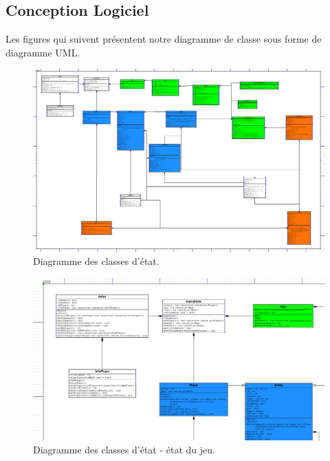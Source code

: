 \subsection{Conception Logiciel}

Les figures qui suivent présentent notre diagramme de classe sous forme de diagramme UML.


\begin{landscape}
\begin{figure}[p]
\includegraphics[width=0.8\paperheight]{images/state.png}
\caption{\label{uml:state}Diagramme des classes d'état.} 
\end{figure}
\end{landscape}

\begin{landscape}
\begin{figure}[p]
\includegraphics[width=0.8\paperheight]{images/state1.png}
\caption{\label{uml:state}Diagramme des classes d'état - état du jeu.} 
\end{figure}
\end{landscape}

